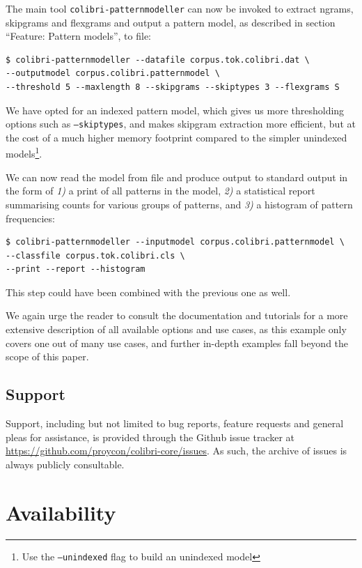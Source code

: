 The main tool \texttt{colibri-patternmodeller} can now be invoked to extract
ngrams, skipgrams and flexgrams and output a pattern model, as described in
section ``Feature: Pattern models'', to file:

\begin{verbatim}
$ colibri-patternmodeller --datafile corpus.tok.colibri.dat \
--outputmodel corpus.colibri.patternmodel \
--threshold 5 --maxlength 8 --skipgrams --skiptypes 3 --flexgrams S
\end{verbatim}

We have opted for an indexed pattern model, which gives us more thresholding
options such as \texttt{--skiptypes}, and makes skipgram extraction more
efficient, but at the cost of a much higher memory footprint compared to
the simpler unindexed models\footnote{Use the \texttt{--unindexed} flag to
build an unindexed model}.

We can now read the model from file and produce output to standard output in
the form of \emph{1)} a print of all patterns in the model, \emph{2)} a
statistical report summarising counts for various groups of patterns, and
\emph{3)} a histogram of pattern frequencies:

\begin{verbatim}
$ colibri-patternmodeller --inputmodel corpus.colibri.patternmodel \
--classfile corpus.tok.colibri.cls \
--print --report --histogram
\end{verbatim}

This step could have been combined with the previous one as well.

We again urge the reader to consult the documentation and tutorials for a more
extensive description of all available options and use cases, as this example
only covers one out of many use cases, and further in-depth examples fall beyond
the scope of this paper.

\subsection*{Support}

Support, including but not limited to bug reports, feature requests and general
pleas for assistance, is provided through the Github issue tracker at
\url{https://github.com/proycon/colibri-core/issues}. As such, the archive of
issues is always publicly consultable.

\section{Availability}

